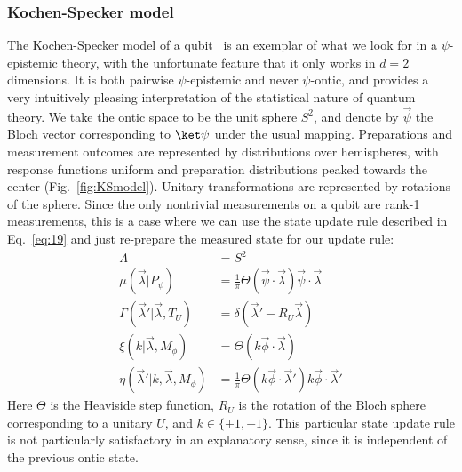 \documentclass[%
 reprint,
superscriptaddress,
nofootinbib,
 amsmath,amssymb,
 prx, 
 accepted=2019-09-27,
]{quantumarticle}
\begin{document}
\subsubsection{Kochen-Specker model}
\label{sec:kochen-specker-model}
The Kochen-Specker model of a
qubit~\cite{KochenProblemHiddenVariables1967,Leiferquantumstatereal2014}
is an exemplar of what we look for in a $\psi$-epistemic theory, with
the unfortunate feature that it only works in $d=2$ dimensions. It is
both pairwise $\psi$-epistemic and never $\psi$-ontic, and provides a
very intuitively pleasing interpretation of the statistical nature of
quantum theory. We take the ontic space to be the unit sphere $S^2$,
and denote by $\vec\psi$ the Bloch vector corresponding to $\ket\psi$
under the usual mapping. Preparations and measurement outcomes are
represented by distributions over hemispheres, with response functions
uniform and preparation distributions peaked towards the center
(Fig.~\ref{fig:KSmodel}). Unitary transformations are represented by
rotations of the sphere. Since the only nontrivial measurements on a
qubit are rank-1 measurements, this is a case where we can use the
state update rule described in Eq.~\ref{eq:19} and just re-prepare the
measured state for our update rule:
\begin{align}
  \Lambda
  &= S^2\nonumber\\
  \mu(\vec\lambda|P_\psi)
  &=\frac{1}{\pi}\Theta(\vec\psi\cdot\vec\lambda)\vec\psi\cdot\vec\lambda\nonumber\\
  \Gamma(\vec\lambda'|\vec\lambda,T_U)
  &= \delta(\vec\lambda'-R_U\vec\lambda)\nonumber\\
  \xi(k|\vec\lambda,M_\phi)
  &= \Theta(k\vec\phi\cdot\vec\lambda)\nonumber\\
  \eta(\vec\lambda'|k,\vec\lambda,M_\phi)
  &= \frac{1}{\pi}\Theta(k\vec\phi\cdot\vec\lambda')k\vec\phi\cdot\vec\lambda'
\end{align}
Here $\Theta$ is the Heaviside step function, $R_U$ is the rotation of
the Bloch sphere corresponding to a unitary $U$, and
$k\in\{+1,-1\}$. This particular state update rule is not particularly
satisfactory in an explanatory sense, since it is independent of the
previous ontic state.
\end{document}
